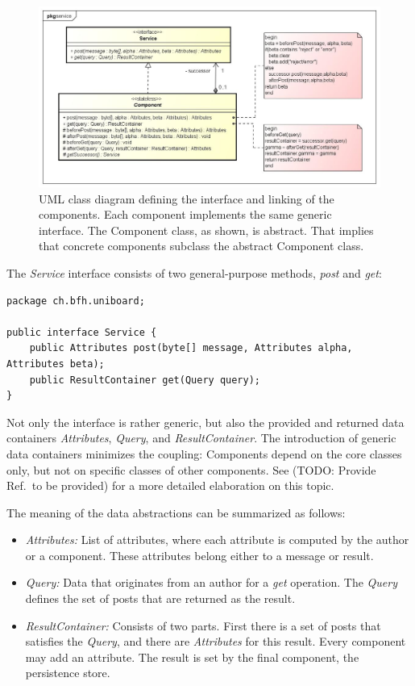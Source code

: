 \documentclass[oneside]{scrreprt}
\begin{document}
\begin{figure}[ht]
\centerline{
\includegraphics[width=1.0\textwidth]{figs/chain-of-components}}
\caption{UML class diagram defining the interface and linking
of the components. Each component implements the same generic
interface. The Component class, as shown, is abstract. That
implies that concrete components subclass the abstract
Component class.}
\label{fig:chain-of-components}
\end{figure}

The \emph{Service} interface consists of two
general-purpose methods, \emph{post} and \emph{get}:

\begin{lstlisting}[style=javastyle]
package ch.bfh.uniboard;

public interface Service {
    public Attributes post(byte[] message, Attributes alpha, Attributes beta);
    public ResultContainer get(Query query);
}
\end{lstlisting}

Not only the interface is rather generic, but also the provided
and returned data containers \emph{Attributes},
\emph{Query}, and \emph{ResultContainer}. The introduction of generic
data containers minimizes the coupling: Components depend on
the core classes only, but not on specific classes of other
components. See (TODO: Provide Ref.\ to be provided) for
a more detailed elaboration on this topic.

The meaning of the data abstractions can be summarized as follows:

\begin{itemize}
	\item \emph{Attributes:} List of attributes, where each attribute is computed
		by the author or a component. These attributes belong either to a message or result.
	\item \emph{Query:} Data that originates from an author
		for a \emph{get} operation. The \emph{Query} defines the set of posts that are returned as the result.
	\item \emph{ResultContainer:} Consists of two parts. First there is a set of posts that satisfies the \emph{Query}, and there are \emph{Attributes} for this result. Every component may add an attribute. The result is set by the final component, the persistence store.
\end{itemize}
\end{document}
